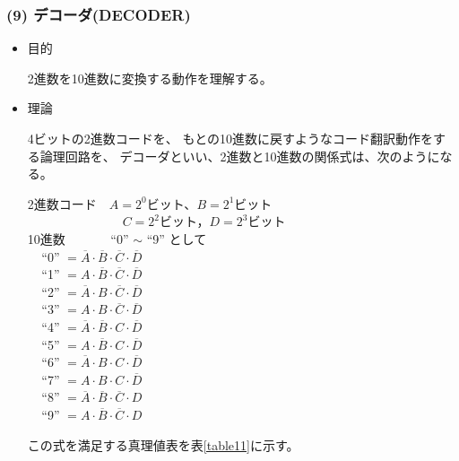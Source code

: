 \documentclass[12pt]{jarticle}
\begin{document}
\subsubsection*{(9) デコーダ(DECODER)}
\begin{itemize}
    \item 目的

          2進数を10進数に変換する動作を理解する。

    \item 理論

          4ビットの2進数コードを、
          もとの10進数に戻すようなコード翻訳動作をする論理回路を、
          デコーダといい、2進数と10進数の関係式は、次のようになる。

          \clearpage

          \begin{center}
              2進数コード　$A = 2^0$ビット、$B = 2^1$ビット \\
              $\;\;\;\;\;\;\;\;\;\;\;\;\;\;\;\;\;\;\;\;\;\;\;\;\;\;$ $C = 2^2$ビット，$D = 2^3$ビット　\\
              10進数　 $\;\;\;\;\;\;\;$ ``0'' $\sim$ ``9'' として $\;\;\;\;\;\;\;\;\;\;\;\;\;\;\;\;\;\;\;\;$ \\
              $\;\;\:$ ``0'' $= \overline{A} \cdot \overline{B} \cdot \overline{C} \cdot \overline{D}$\\
              $\;\;\:$ ``1'' $= A \cdot \overline{B} \cdot \overline{C} \cdot \overline{D}$ \\
              $\;\;\:$ ``2'' $= \overline{A} \cdot B \cdot \overline{C} \cdot \overline{D}$ \\
              $\;\;\:$ ``3'' $= A \cdot B \cdot \overline{C} \cdot \overline{D}$ \\
              $\;\;\:$ ``4'' $= \overline{A} \cdot \overline{B} \cdot C \cdot \overline{D}$ \\
              $\;\;\:$ ``5'' $= A \cdot \overline{B} \cdot C \cdot \overline{D}$ \\
              $\;\;\:$ ``6'' $= \overline{A} \cdot B \cdot C \cdot \overline{D}$ \\
              $\;\:\;$ ``7'' $= A \cdot B \cdot C \cdot \overline{D}$ \\
              $\;\:\;$ ``8'' $= \overline{A} \cdot \overline{B} \cdot \overline{C} \cdot D$ \\
              $\;\:\;$ ``9'' $= A \cdot \overline{B} \cdot \overline{C} \cdot D$
          \end{center}
          この式を満足する真理値表を表\ref{table11}に示す。


\end{itemize}
\end{document}
